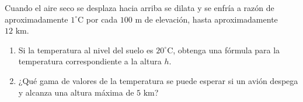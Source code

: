 \item Cuando el aire seco se desplaza hacia arriba se dilata y se enfría a razón de aproximadamente $1^\circ\text{C}$ por cada $100\text{ m}$ de elevación, hasta aproximadamente $12\text{ km}$.
    \begin{enumerate}
        \item[(a)] Si la temperatura al nivel del suelo es $20^\circ\text{C}$, obtenga una fórmula para la temperatura correspondiente a la altura $h$.\item[(b)] ¿Qué gama de valores de la temperatura se puede esperar si un avión despega y alcanza una altura máxima de $5\text{ km}$?
    \end{enumerate}

